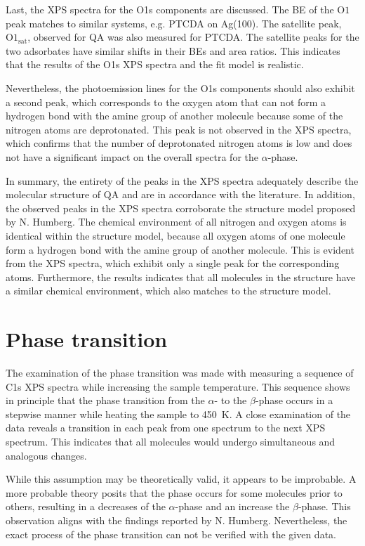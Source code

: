 Last, the \ac{XPS} spectra for the O1s components are discussed. The \ac{BE} of the $\mathrm{O1}$ peak matches to similar systems, e.g. \ac{PTCDA} on Ag(100).\autocite{Bauer2014} The satellite peak, $\mathrm{O1_{sat}}$, observed for \ac{QA} was also measured for \ac{PTCDA}. The satellite peaks for the two adsorbates have similar shifts in their \acp{BE} and area ratios. This indicates that the results of the O1s \ac{XPS} spectra and the fit model is realistic.

Nevertheless, the photoemission lines for the O1s components should also exhibit a second peak, which corresponds to the oxygen atom that can not form a hydrogen bond with the amine group of another molecule because some of the nitrogen atoms are deprotonated. This peak is not observed in the \ac{XPS} spectra, which confirms that the number of deprotonated nitrogen atoms is low and does not have a significant impact on the overall spectra for the $\alpha$-phase.

In summary, the entirety of the peaks in the \ac{XPS} spectra adequately describe the molecular structure of \ac{QA} and are in accordance with the literature. In addition, the observed peaks in the \ac{XPS} spectra corroborate the structure model proposed by N. Humberg.\autocite{Humberg2024} The chemical environment of all nitrogen and oxygen atoms is identical within the structure model, because all oxygen atoms of one molecule form a hydrogen bond with the amine group of another molecule. This is evident from the \ac{XPS} spectra, which exhibit only a single peak for the corresponding atoms. Furthermore, the results indicates that all molecules in the structure have a similar chemical environment, which also matches to the structure model.

\section{Phase transition}

The examination of the phase transition was made with measuring a sequence of C1s \ac{XPS} spectra while increasing the sample temperature. This sequence shows in principle that the phase transition from the $\alpha$- to the $\beta$-phase occurs in a stepwise manner while heating the sample to 450~\si{K}. A close examination of the data reveals a transition in each peak from one spectrum to the next \ac{XPS} spectrum. This indicates that all molecules would undergo simultaneous and analogous changes.

While this assumption may be theoretically valid, it appears to be improbable. A more probable theory posits that the phase occurs for some molecules prior to others, resulting in a decreases of the $\alpha$-phase and an increase the $\beta$-phase. This observation aligns with the findings reported by N. Humberg.\autocite{Humberg2024} Nevertheless, the exact process of the phase transition can not be verified with the given data.

